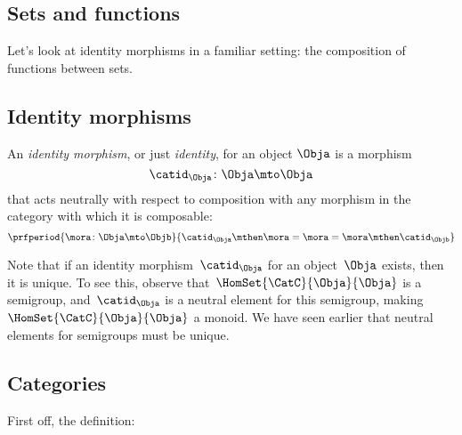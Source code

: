 \subsection{Sets and functions}

Let's look at identity morphisms in a familiar setting: the composition of functions between sets.

\subsection{Identity morphisms}

\begin{ctdefinition}
    \label{def:identity-morphism}
    An \emph{identity morphism}, or just \emph{identity}, for an object $\Obja$
    is a morphism
    \begin{equation*}
        \catid_{\Obja}\colon \Obja \mto \Obja
    \end{equation*}
    that acts neutrally with respect to composition with any morphism in the category with which it is composable:
    \begin{equation*}
        \prfperiod{
            \mora \colon \Obja \mto \Objb
        }{
            \catid_\Obja \mthen \mora= \mora = \mora \mthen \catid_\Objb
        }
    \end{equation*}
\end{ctdefinition}

Note that if an identity morphism~$\catid_{\Obja}$ for an object~$\Obja$ exists, then it is unique.
To see this, observe that~$\HomSet{\CatC}{\Obja}{\Obja}$ is a semigroup, and~$\catid_{\Obja}$ is a neutral element for this semigroup, making~$\HomSet{\CatC}{\Obja}{\Obja}$ a monoid.
We have seen earlier that neutral elements for semigroups must be unique.

\subsection{Categories}

First off, the definition:

